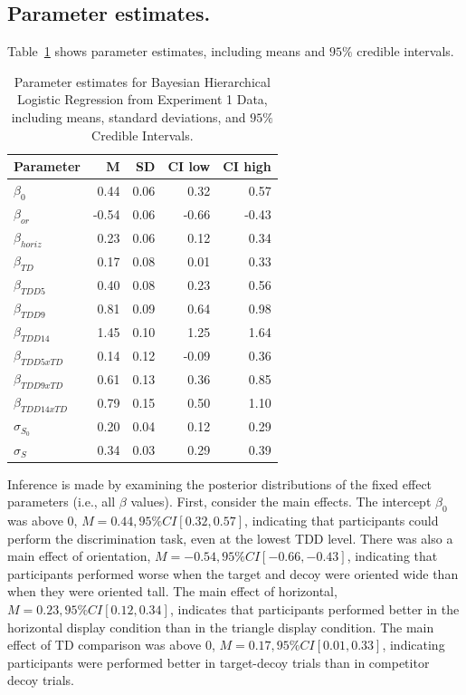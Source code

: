 \subsection{Parameter estimates.}

Table~\ref{tab:e1_params} shows parameter estimates, including means and $95\%$ credible intervals. 
\begin{table}[ht]
    \centering
    \begin{tabular}{l r r r r}
        \toprule
        Parameter & M & SD & CI low & CI high \\
        \midrule
        $\beta_{0}$ & 0.44 & 0.06 & 0.32 & 0.57 \\
        $\beta_{or}$ & -0.54 & 0.06 & -0.66 & -0.43\\
        $\beta_{horiz}$ & 0.23 & 0.06 & 0.12 & 0.34\\
        $\beta_{TD}$ & 0.17 & 0.08 & 0.01 & 0.33\\
        $\beta_{TDD5}$ & 0.40 & 0.08 & 0.23 & 0.56\\
        $\beta_{TDD9}$ & 0.81 & 0.09 & 0.64 & 0.98\\
        $\beta_{TDD14}$ & 1.45 & 0.10 & 1.25 & 1.64\\
        $\beta_{TDD5xTD}$ & 0.14 & 0.12 & -0.09 & 0.36\\
        $\beta_{TDD9xTD}$ & 0.61 & 0.13 & 0.36 & 0.85\\
        $\beta_{TDD14xTD}$ & 0.79 & 0.15 & 0.50 & 1.10\\
        $\sigma_{S_0}$ & 0.20 & 0.04 & 0.12 & 0.29 \\
        $\sigma_{S}$ & 0.34 & 0.03 & 0.29 & 0.39 \\
    \bottomrule 
    \end{tabular}
    \caption{Parameter estimates for Bayesian Hierarchical Logistic Regression from Experiment 1 Data, including means, standard deviations, and $95\%$ Credible Intervals.}
    \label{tab:e1_params}
 \end{table}
    
 Inference is made by examining the posterior distributions of the fixed effect parameters (i.e., all $\beta$ values). First, consider the main effects. The intercept $\beta_{0}$ was above $0$, $\textit{M}=0.44, 95\%CI [0.32, 0.57]$, indicating that participants could perform the discrimination task, even at the lowest TDD level. There was also a main effect of orientation, $\textit{M}=-0.54, 95\%CI [-0.66, -0.43]$, indicating that participants performed worse when the target and decoy were oriented wide than when they were oriented tall. The main effect of horizontal, $\textit{M}=0.23, 95\%CI [0.12, 0.34]$, indicates that participants performed better in the horizontal display condition than in the triangle display condition. The main effect of TD comparison was above 0, $\textit{M}=0.17, 95\%CI [0.01, 0.33]$, indicating participants were performed better in target-decoy trials than in competitor decoy trials. 

